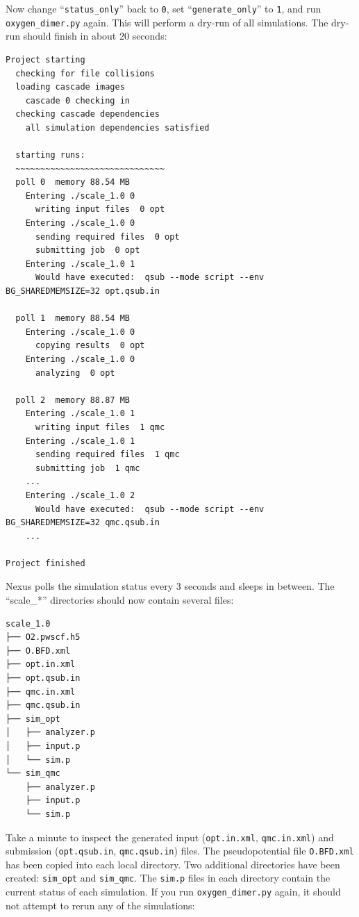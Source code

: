 \documentclass[oneside,11pt]{memoir}
\numberwithin{equation}{section}
\begin{document}
Now change ``\texttt{status\_only}'' back to \texttt{0}, set ``\texttt{generate\_only}'' to \texttt{1}, and run \texttt{oxygen\_dimer.py} again.  This will perform a dry-run of all simulations.  The dry-run should finish in about 20 seconds:
\begin{shaded}
\begin{verbatim}
Project starting 
  checking for file collisions 
  loading cascade images 
    cascade 0 checking in 
  checking cascade dependencies 
    all simulation dependencies satisfied 
  
  starting runs:
  ~~~~~~~~~~~~~~~~~~~~~~~~~~~~~~ 
  poll 0  memory 88.54 MB 
    Entering ./scale_1.0 0 
      writing input files  0 opt 
    Entering ./scale_1.0 0 
      sending required files  0 opt 
      submitting job  0 opt 
    Entering ./scale_1.0 1 
      Would have executed:  qsub --mode script --env BG_SHAREDMEMSIZE=32 opt.qsub.in 

  poll 1  memory 88.54 MB 
    Entering ./scale_1.0 0 
      copying results  0 opt 
    Entering ./scale_1.0 0 
      analyzing  0 opt 

  poll 2  memory 88.87 MB 
    Entering ./scale_1.0 1 
      writing input files  1 qmc 
    Entering ./scale_1.0 1 
      sending required files  1 qmc 
      submitting job  1 qmc 
    ...
    Entering ./scale_1.0 2 
      Would have executed:  qsub --mode script --env BG_SHAREDMEMSIZE=32 qmc.qsub.in 
    ...

Project finished
\end{verbatim}
\end{shaded}
\noindent
Nexus polls the simulation status every 3 seconds and sleeps in between.  The ``scale\_*'' directories should now contain several files:
\begin{shaded}
\begin{verbatim}
scale_1.0
├── O2.pwscf.h5
├── O.BFD.xml
├── opt.in.xml
├── opt.qsub.in
├── qmc.in.xml
├── qmc.qsub.in
├── sim_opt
│   ├── analyzer.p
│   ├── input.p
│   └── sim.p
└── sim_qmc
    ├── analyzer.p
    ├── input.p
    └── sim.p
\end{verbatim}
\end{shaded}
\noindent
Take a minute to inspect the generated input (\texttt{opt.in.xml}, \texttt{qmc.in.xml}) and submission (\texttt{opt.qsub.in}, \texttt{qmc.qsub.in}) files.  The pseudopotential file \texttt{O.BFD.xml} has been copied into each local directory. Two additional directories have been created: \texttt{sim\_opt} and \texttt{sim\_qmc}.  The \texttt{sim.p} files in each directory contain the current status of each simulation.  If you run \texttt{oxygen\_dimer.py} again, it should not attempt to rerun any of the simulations:   
\end{document}
